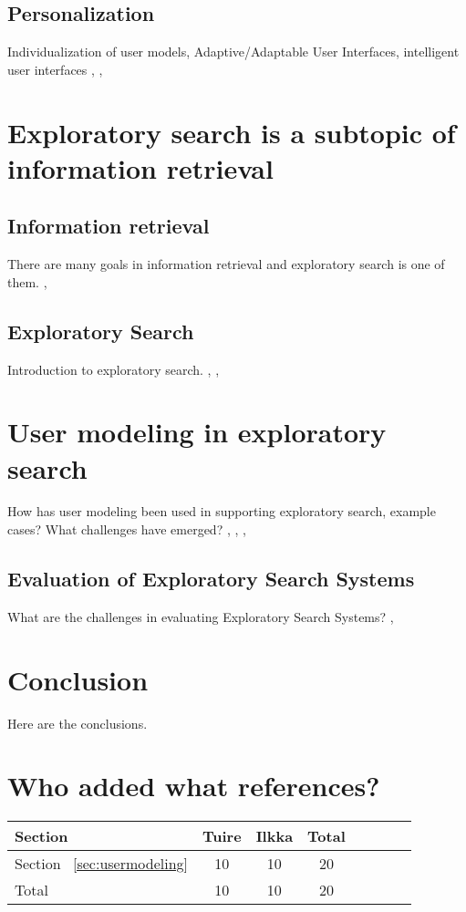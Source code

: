 \documentclass{sigchi}
\begin{document}
\subsection{Personalization}
Individualization of user models, Adaptive/Adaptable User Interfaces, intelligent user interfaces
\cite{bunt04}, \cite{findlater04}, \cite{brusi96}

\section {Exploratory search is a subtopic of information retrieval}

\subsection{Information retrieval}
There are many goals in information retrieval and exploratory search is one of them.
\cite{hearst02}, \cite{kuhlt91}

\subsection{Exploratory Search}
Introduction to exploratory search.
\cite{march06}, \cite{white09}, \cite{tvaro11}

\section{User modeling in exploratory search}
How has user modeling been used in supporting exploratory search, example cases? What challenges have emerged? 
\cite{oconnor10}, \cite{sugi04}, \cite{white07}, \cite{kules09}

\subsection{Evaluation of Exploratory Search Systems}
What are the challenges in evaluating Exploratory Search Systems?
\cite{whitemm08}, \cite{kules08}

\section{Conclusion}
Here are the conclusions.

\section{Who added what references?}

\begin{tabular}{l*{6}{c}r}
Section           & Tuire & Ilkka & Total \\
\hline
Section ~\ref{sec:usermodeling}        & 10 & 10 & 20 \\
\hline
Total             &  10 & 10 & 20  \\
\end{tabular}
\end{document}
